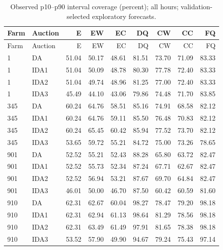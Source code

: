 \documentclass[11pt,a4paper]{article}
\begin{document}
\begin{longtable}{llrrrrrrr}
\caption{Observed p10--p90 interval coverage (percent); all hours; validation-selected exploratory forecasts.}\\
\toprule Farm & Auction & E & EW & EC & DQ & CW & CC & FQ \\
\midrule\endfirsthead
\toprule Farm & Auction & E & EW & EC & DQ & CW & CC & FQ \\
\midrule\endhead
1 & DA & 51.04 & 50.17 & 48.61 & 81.51 & 73.70 & 71.09 & 83.33 \\
1 & IDA1 & 51.04 & 50.09 & 48.78 & 80.30 & 77.78 & 72.40 & 83.33 \\
1 & IDA2 & 51.04 & 49.74 & 48.96 & 81.25 & 77.00 & 72.40 & 83.33 \\
1 & IDA3 & 45.49 & 44.10 & 43.06 & 79.86 & 74.48 & 71.70 & 83.85 \\
\midrule
345 & DA & 60.24 & 64.76 & 58.51 & 85.16 & 74.91 & 68.58 & 82.12 \\
345 & IDA1 & 60.24 & 64.76 & 59.11 & 85.50 & 76.48 & 70.83 & 82.12 \\
345 & IDA2 & 60.24 & 65.45 & 60.42 & 85.94 & 77.52 & 73.70 & 82.12 \\
345 & IDA3 & 53.65 & 59.72 & 55.21 & 84.72 & 75.00 & 73.26 & 78.65 \\
\midrule
901 & DA & 52.52 & 55.21 & 52.43 & 88.28 & 65.80 & 63.72 & 82.47 \\
901 & IDA1 & 52.52 & 55.73 & 52.34 & 87.24 & 67.71 & 62.67 & 82.47 \\
901 & IDA2 & 52.52 & 56.94 & 53.21 & 87.67 & 69.70 & 64.84 & 82.47 \\
901 & IDA3 & 46.01 & 50.00 & 46.70 & 87.50 & 60.42 & 60.59 & 81.60 \\
\midrule
910 & DA & 62.31 & 62.67 & 60.04 & 98.27 & 78.47 & 79.20 & 98.18 \\
910 & IDA1 & 62.31 & 62.94 & 61.13 & 98.64 & 81.29 & 78.56 & 98.18 \\
910 & IDA2 & 62.31 & 63.49 & 61.49 & 97.91 & 81.65 & 78.38 & 98.18 \\
910 & IDA3 & 53.52 & 57.90 & 49.90 & 94.67 & 79.24 & 75.43 & 97.14 \\
\midrule
\bottomrule\end{longtable}
\normalsize
\small
\end{document}

